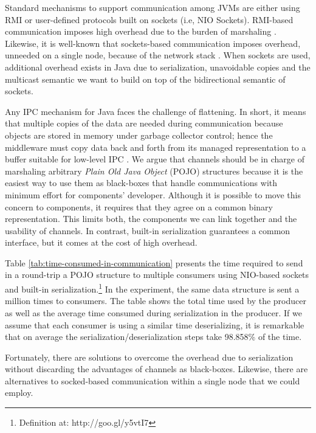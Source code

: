 Standard mechanisms to support communication among JVMs are either using RMI or user-defined protocols built on sockets (i.e, NIO Sockets).
RMI-based communication imposes high overhead due to the burden of marshaling \cite{Carpenter:1999:OSM:304065.304099, Maassen:1999:EIJ:329366.301120}.
Likewise, it is well-known that sockets-based communication imposes overhead, unneeded on a single node, because of the network stack \cite{Goglin2013176}.
When sockets are used, additional overhead exists in Java due to serialization, unavoidable copies and the multicast semantic we want to build on top of the bidirectional semantic of sockets.

Any IPC mechanism for Java faces the challenge of flattening.
In short, it means that multiple copies of the data are needed during communication because objects are stored in memory under garbage collector control; hence the middleware must copy data back and forth from its managed representation to a buffer suitable for low-level IPC \cite{Carpenter:1999:OSM:304065.304099}.
We argue that channels should be in charge of marshaling arbitrary \textit{Plain Old Java Object} (POJO) structures because it is the easiest way to use them as black-boxes that handle communications with minimum effort for components' developer.
Although it is possible to move this concern to components, it requires that they agree on a common binary representation.
This limits both, the components we can link together and the usability of channels.
In contrast, built-in serialization guarantees a common interface, but it comes at the cost of high overhead. 

Table \ref{tab:time-consumed-in-communication} presents the time required to send in a round-trip a POJO structure to multiple consumers using NIO-based sockets and built-in serialization.\footnote{Definition at: http://goo.gl/y5vtI7}
In the experiment, the same data structure is sent a million times to consumers.
The table shows the total time used by the producer as well as the average time consumed during serialization in the producer.
If we assume that each consumer is using a similar time deserializing, it is remarkable that on average the serialization/deserialization steps take 98.858\% of the time.

Fortunately, there are solutions to overcome the overhead due to serialization without discarding the advantages of channels as black-boxes.
Likewise, there are alternatives to socked-based communication within a single node that we could employ.

